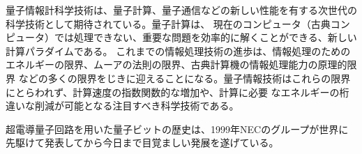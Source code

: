 量子情報計科学技術は、量子計算、量子通信などの新しい性能を有する次世代の科学技術として期待されている。量子計算は、
現在のコンピュータ（古典コンピュータ）では処理できない、重要な問題を効率的に解くことができる、新しい計算パラダイムである。
これまでの情報処理技術の進歩は、情報処理のためのエネルギーの限界、ムーアの法則の限界、古典計算機の情報処理能力の原理的限界
などの多くの限界をじきに迎えることになる。量子情報技術はこれらの限界にとらわれず、計算速度の指数関数的な増加や、計算に必要
なエネルギーの桁違いな削減が可能となる注目すべき科学技術である。

超電導量子回路を用いた量子ビットの歴史は、1999年NECのグループが世界に先駆けて発表してから今日まで目覚ましい発展を遂げている。
